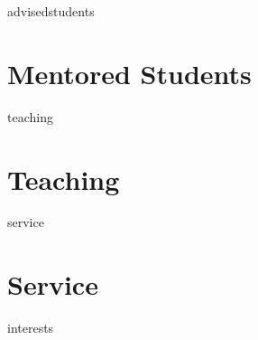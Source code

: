 \documentclass[12pt]{report} %
\begin{document}
\iffalse
\ifcsname grants\endcsname%
\section{Grant Writing}
\grants{}
\fi
\fi



\ifcsname advisedstudents\endcsname%
\section{Mentored Students}
\advisedstudents{}
\fi



\ifcsname teaching\endcsname%
\section{Teaching}
\teaching{}
\fi



\ifcsname service\endcsname%
\section{Service}
\service{}
\fi



\iffalse
\ifcsname languages\endcsname%
\section{Languages}
\languages{}
\fi
\fi



\iffalse
\ifcsname interests\endcsname%
\end{document}
